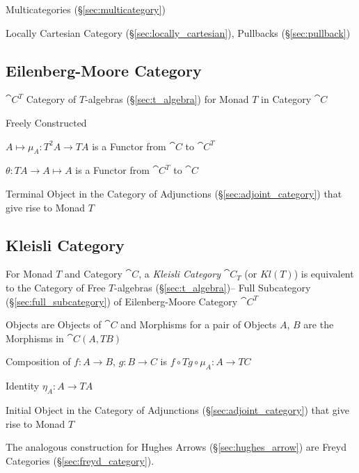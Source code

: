 Multicategories (\S\ref{sec:multicategory})

Locally Cartesian Category (\S\ref{sec:locally_cartesian}), Pullbacks
(\S\ref{sec:pullback})



\subsection{Eilenberg-Moore Category}\label{sec:eilenberg_moore}

$\cat{C}^T$ Category of $T$-algebras (\S\ref{sec:t_algebra}) for
Monad $T$ in Category $\cat{C}$

Freely Constructed

$A \mapsto \mu_A : T^2 A \rightarrow T A$ is a Functor from
$\cat{C}$ to $\cat{C}^T$

$\theta : T A \rightarrow A \mapsto A$ is a Functor from
$\cat{C}^T$ to $\cat{C}$

Terminal Object in the Category of Adjunctions
(\S\ref{sec:adjoint_category}) that give rise to Monad $T$



\subsection{Kleisli Category}\label{sec:kleisli_category}

For Monad $T$ and Category $\cat{C}$, a \emph{Kleisli Category}
$\cat{C}_T$ (or $Kl(T)$) is equivalent to the Category of Free
$T$-algebras (\S\ref{sec:t_algebra})-- Full Subcategory
(\S\ref{sec:full_subcategory}) of Eilenberg-Moore Category
$\cat{C}^T$

Objects are Objects of $\cat{C}$ and Morphisms for a pair of
Objects $A$, $B$ are the Morphisms in $\cat{C}(A, T B)$

Composition of $f : A \rightarrow B$, $g : B \rightarrow C$ is $f
\circ T g \circ \mu_A : A \rightarrow TC$

Identity $\eta_A : A \rightarrow T A$

Initial Object in the Category of Adjunctions
(\S\ref{sec:adjoint_category}) that give rise to Monad $T$

The analogous construction for Hughes Arrows
(\S\ref{sec:hughes_arrow}) are Freyd Categories
(\S\ref{sec:freyd_category}).

